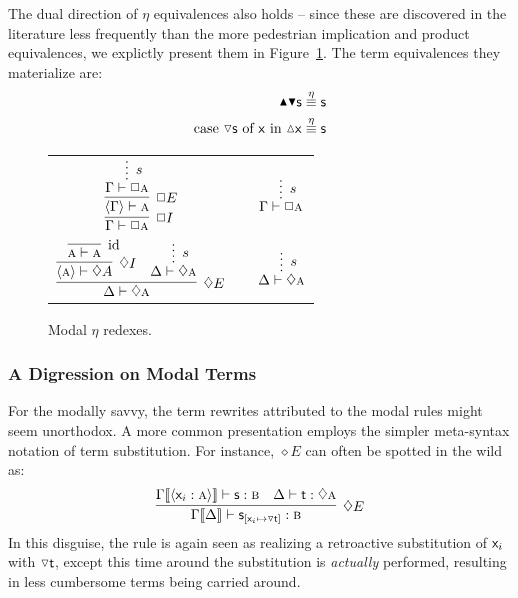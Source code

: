 The dual direction of $\eta$ equivalences also holds -- since these are discovered in the literature less frequently than the more pedestrian implication and product equivalences, we explictly present them in Figure~\ref{figure:modal_eta_reductions}.
The term equivalences they materialize are:
\begin{align}
\boxintro \boxelim \term{s} & \overset{\eta}{\equiv} \term{s}\\
\cterm{case \term{\diaelim{s}} of \term{x} in \term{\diaintro{x}}} & \overset{\eta}{\equiv} \term{s}
\end{align}

\begin{figure}
	\centering
		\begin{tabularx}{0.8\textwidth}{@{}ccc@{}}
			$\infer[\Box I]{\Gamma \vdash \Box\prop{a}}{
			\infer[\Box E]{\bracket{\Gamma} \vdash \prop{a}}{
					\infer*[s]{\Gamma \vdash  \Box\prop{a}}{}
				}
			}
			$
			&
			\raisebox{5pt}{$\equiv$}
			&
			$\infer*[s]{\Gamma \vdash \Box\prop{a}}{}
			$\\[\smallsep]
			$\infer[\diamond E]{\Delta \vdash \diamond\prop{a}}{
				\infer[\diamond I]{\bracket{\prop{a}}\vdash \diamond A}{
					\infer[\Ax]{\prop{a} \vdash \prop{a}}{}
				}
				&
				\infer*[s]{\Delta \vdash \diamond\prop{a}}{}
			}$
			&
			\raisebox{15pt}{$\equiv$}
			&
			$\infer*[s]{\Delta \vdash \diamond \prop{a}}{}
			$
		\end{tabularx}
	\caption{Modal $\eta$ redexes.}
	\label{figure:modal_eta_reductions}
\end{figure}


\subsubsection{A Digression on Modal Terms}
For the modally savvy, the term rewrites attributed to the modal rules might seem unorthodox.
A more common presentation employs the simpler meta-syntax notation of term substitution.
For instance, $\diamond E$ can often be spotted in the wild as:
\[
	\infer[\diamond E]{\Gamma\ctx{\Delta} \vdash \term{s}_{[\term{\vari }\mapsto\term{\diaelim t}]}: \prop{b}}{
		\Gamma\ctx{\bracket{\term{\vari }:\prop{a}}}\vdash\term{s}:\prop{b}
		&
		\Delta \vdash \term{t}:\diamond\prop{a}
	}
\]
In this disguise, the rule is again seen as realizing a retroactive substitution of $\mathsf{\mathsf{x}_{\mathnormal{i}} }$ with $\smallterm{\diaelim t}$, except this time around the substitution is \textit{actually} performed, resulting in less cumbersome terms being carried around.


